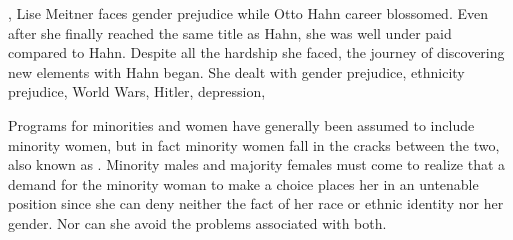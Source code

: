 \par
{},\cite{kopievan}
Lise Meitner faces gender prejudice while Otto Hahn career blossomed. Even after she finally reached the same title as Hahn, she was
well under paid compared to Hahn. Despite all the hardship she faced, the journey of discovering new elements with Hahn began. She dealt
with gender prejudice, ethnicity prejudice, World Wars, Hitler, depression,


\par
Programs for minorities and women have generally been assumed to include minority women, but in fact minority women fall in the cracks 
between the two, also known as .\cite{doublebind}
Minority males and majority females must come to realize that a demand for the minority woman to make a choice places her in an untenable
position since she can deny neither the fact of her race or ethnic identity nor her gender. Nor can she avoid the problems associated with 
both. 
